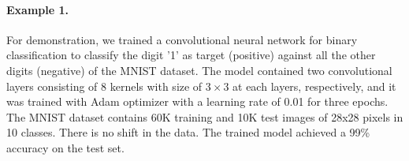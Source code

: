 \documentclass{article}
\begin{document}
\paragraph{Example 1.} \label{ex:vanilla} For demonstration, we trained a convolutional neural network for binary classification to classify the digit '1' as target (positive) against all the other digits (negative) of the MNIST dataset. The model contained two convolutional layers consisting of 8 kernels with size of $3\times3$ at each layers, respectively, and it was trained with Adam optimizer with a learning rate of 0.01 for three epochs. The MNIST dataset contains 60K training and 10K test images of 28x28 pixels in 10 classes. There is no shift in the data. The trained model achieved a 99\% accuracy on the test set.
\end{document}
